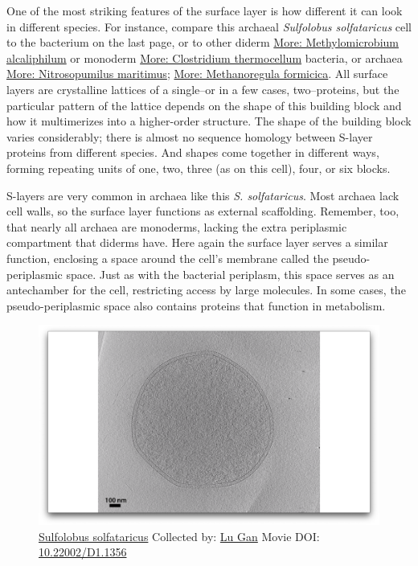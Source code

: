 \documentclass[]{tufte-book}
\begin{document}
One of the most striking features of the surface layer is how different
it can look in different species. For instance, compare this archaeal
\emph{Sulfolobus solfataricus} cell to the bacterium on the last page,
or to other diderm
\protect\hyperlink{Methylomicrobium_alcaliphilum}{More: Methylomicrobium
alcaliphilum} or monoderm
\protect\hyperlink{Clostridium_thermocellum}{More: Clostridium
thermocellum} bacteria, or archaea
\protect\hyperlink{Nitrosopumilus_maritimus}{More: Nitrosopumilus
maritimus}; \protect\hyperlink{Methanoregula_formicica}{More:
Methanoregula formicica}. All surface layers are crystalline lattices of
a single--or in a few cases, two--proteins, but the particular pattern
of the lattice depends on the shape of this building block and how it
multimerizes into a higher-order structure. The shape of the building
block varies considerably; there is almost no sequence homology between
S-layer proteins from different species. And shapes come together in
different ways, forming repeating units of one, two, three (as on this
cell), four, or six blocks.

S-layers are very common in archaea like this \emph{S. solfataricus}.
Most archaea lack cell walls, so the surface layer functions as external
scaffolding. Remember, too, that nearly all archaea are monoderms,
lacking the extra periplasmic compartment that diderms have. Here again
the surface layer serves a similar function, enclosing a space around
the cell's membrane called the pseudo-periplasmic space. Just as with
the bacterial periplasm, this space serves as an antechamber for the
cell, restricting access by large molecules. In some cases, the
pseudo-periplasmic space also contains proteins that function in
metabolism.





\begin{figure}
\includegraphics{movie_stills/2_7} \caption[\protect\hyperlink{tree}{Sulfolobus solfataricus} Collected
by: \protect\hyperlink{lu_gan}{Lu Gan} Movie DOI:
\href{https://doi.org/10.22002/D1.1356}{10.22002/D1.1356}]{\protect\hyperlink{tree}{Sulfolobus solfataricus} Collected
by: \protect\hyperlink{lu_gan}{Lu Gan} Movie DOI:
\href{https://doi.org/10.22002/D1.1356}{10.22002/D1.1356}}\label{fig:2-7}
\end{figure}
\end{document}
